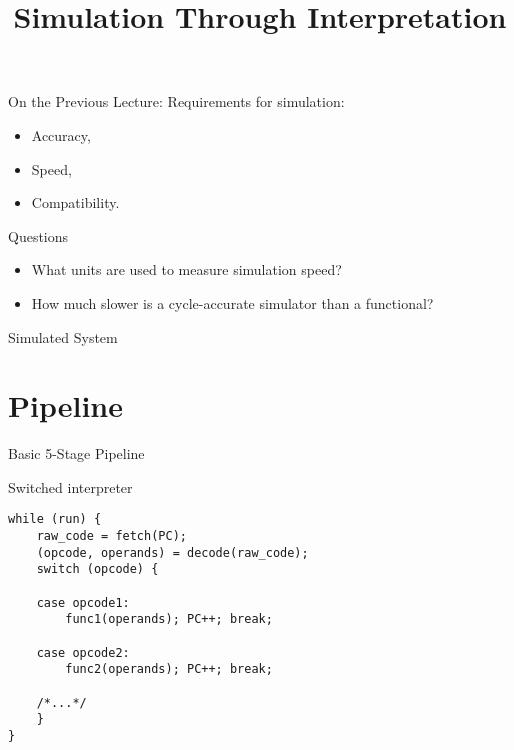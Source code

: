 

\title{Simulation Through Interpretation}



\startslides

\begin{frame}{On the Previous Lecture:}
Requirements for simulation:
\begin{itemize}
\item Accuracy,
\item Speed,
\item Compatibility.
\end{itemize}
\end{frame}

\begin{frame}{Questions}
\begin{itemize}
\item What units are used to measure simulation speed?\pause
\item How much slower is a cycle-accurate simulator than a functional?
\end{itemize}
\end{frame}

\begin{frame}{Simulated System}
\centering
\vfill
{}
\vfill
\end{frame}

\section{Pipeline}


\begin{frame}{Basic 5-Stage Pipeline}
\centering
{}
\end{frame}

\begin{frame}[fragile]{Switched interpreter}
\begin{lstlisting}
while (run) {
    raw_code = fetch(PC);
    (opcode, operands) = decode(raw_code);
    switch (opcode) {

    case opcode1:
        func1(operands); PC++; break;

    case opcode2:
        func2(operands); PC++; break;

    /*...*/
    }
}
\end{lstlisting}
\end{frame}

